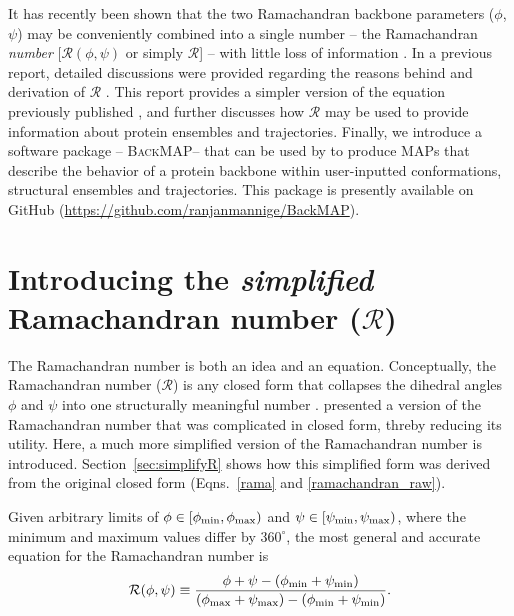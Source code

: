 \documentclass[fleqn,10pt,lineno]{wlpeerj} %
\newcommand{\Eqns}[1]{Eqns.~\ref{#1}}
\newcommand{\gname}{BackMAP}
\newcommand{\pname}{\textsc{\gname}\xspace}
\begin{document}
It has recently been shown that the two Ramachandran backbone parameters ($\phi$,$\psi$) may be conveniently combined into a single number -- the Ramachandran \textit{number} [$\mathcal{R}(\phi,\psi)$ or simply $\mathcal{R}$] -- with little loss of information \citep{Mannige2016}. 
In a previous report, detailed discussions were provided regarding the reasons behind and derivation of $\mathcal{R}$ \citep{Mannige2016}. This report provides a simpler version of the equation previously published \citep{Mannige2016}, and further discusses how $\mathcal{R}$ may be used to provide information about protein ensembles and trajectories. 
Finally, we introduce a software package -- \pname -- that can be used by to produce MAPs that describe the behavior of a protein backbone within user-inputted conformations, structural ensembles and trajectories. This package is presently available on GitHub (\url{https://github.com/ranjanmannige/\gname}).

\section*{Introducing the \textit{simplified} Ramachandran number ($\mathcal{R}$)}

The Ramachandran number is both an idea and an equation. Conceptually, the Ramachandran number ($\mathcal{R}$) is any closed form that collapses the dihedral angles $\phi$ and $\psi$ into one structurally meaningful number \citep{Mannige2016}. \cite{Mannige2016} presented a version of the Ramachandran number that was complicated in closed form, threby reducing its utility. Here, a much more simplified version of the Ramachandran number is introduced. Section~\ref{sec:simplifyR} shows how this simplified form was derived from the original closed form (\Eqns{rama} and \ref{ramachandran_raw}).


Given arbitrary limits of $\phi \in [\phi_{\rm min},\phi_{\rm max})$ and $\psi \in [\psi_{\rm min},\psi_{\rm max})$, where the minimum and maximum values differ by $360^\circ$, the most general and accurate equation for the Ramachandran number is
\begin{equation}
{\mathcal{R}}(\phi,\psi) \equiv  \frac{\phi+\psi-(\phi_{\rm min}+\psi_{\rm min})}{(\phi_{\rm max}+\psi_{\rm max})-(\phi_{\rm min}+\psi_{\rm min})}.
\label{ramaGeneral}
\end{equation}
\end{document}
